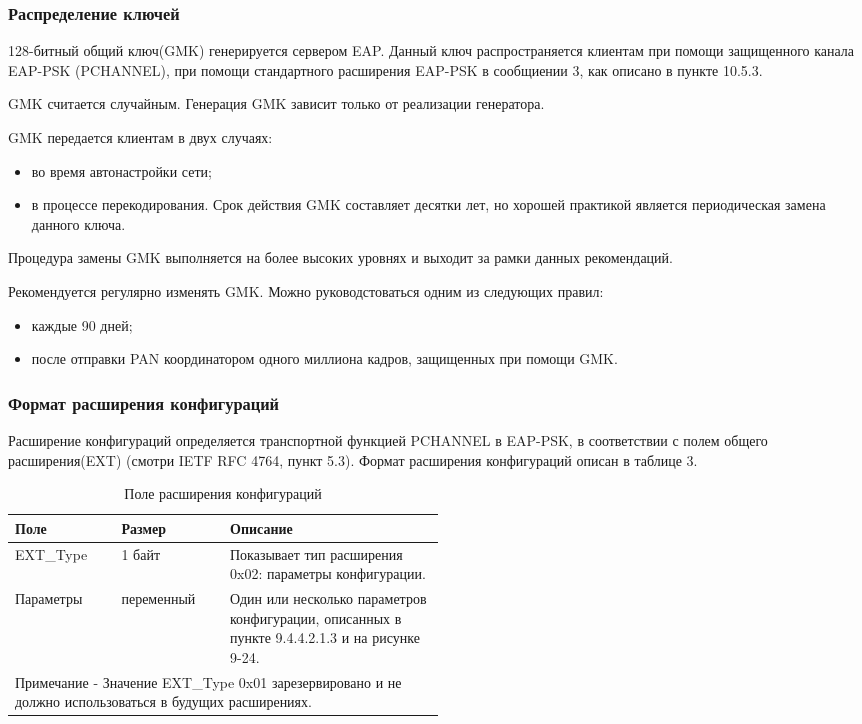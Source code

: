 \subsubsection{Распределение ключей}

128-битный общий ключ(GMK) генерируется сервером EAP. Данный ключ распространяется клиентам при помощи защищенного канала EAP-PSK (PCHANNEL), при помощи стандартного расширения EAP-PSK в сообщиении 3, как описано в пункте 10.5.3.

GMK считается случайным. Генерация GMK зависит только от реализации генератора.

GMK передается клиентам в двух случаях:
\begin{itemize}
 \item во время автонастройки сети;
 \item в процессе перекодирования. Срок действия GMK составляет десятки лет, но хорошей практикой является периодическая замена данного ключа.
\end{itemize}

Процедура замены GMK выполняется на более высоких уровнях и выходит за рамки данных рекомендаций.

Рекомендуется регулярно изменять GMK. Можно руководстоваться одним из следующих правил:
\begin{itemize}
 \item каждые 90 дней;
 \item после отправки PAN координатором одного миллиона кадров, защищенных при помощи GMK.
\end{itemize}

\subsubsection{Формат расширения конфигураций}

Расширение конфигураций определяется транспортной функцией PCHANNEL в EAP-PSK, в соответствии с полем общего расширения(EXT) (смотри IETF RFC 4764, пункт 5.3). Формат расширения конфигураций описан в таблице 3. %


\begin{longtable}[\textwidth]{|l|l|p{0.5\linewidth}|}
  \caption{Поле расширения конфигураций} \\ %
   \hline 
   Поле & Размер & Описание \\ \hline
   EXT\_Type & 1 байт & Показывает тип расширения 0x02: параметры конфигурации. \\ \hline
   Параметры & переменный & Один или несколько параметров конфигурации, описанных в пункте 9.4.4.2.1.3 и на рисунке 9-24. \\ \hline
   \multicolumn{3}{|p{\textwidth}|}{Примечание - Значение EXT\_Type 0x01 зарезервировано и не должно использоваться в будущих расширениях.} \\ \hline
\end{longtable}

